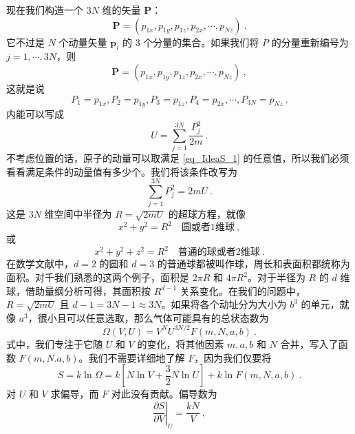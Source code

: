 现在我们构造一个 $3N $ 维的矢量 $\mathbf P$：
\begin{equation}
\mathbf{P}=\left( p_{1x},p_{1y},p_{1z},p_{2x},\cdots ,p_{Nz} \right) ~.
\end{equation}
它不过是 $N$ 个动量矢量 $\boldsymbol p_i$ 的 $3 $ 个分量的集合。如果我们将 $P $ 的分量重新编号为 $j=1, \cdots , 3N$，则
\begin{equation}
\mathbf{P}=\left( p_{1x},p_{1y},p_{1z},p_{2x},\cdots ,p_{Nz} \right) ~,
\end{equation}
这就是说
\begin{equation}
P_1=p_{1x},P_2=p_{1y},P_3=p_{1z},P_4=p_{2x},\cdots ,P_{3N}=p_{Nz}~.
\end{equation}
内能可以写成
\begin{equation} \label{eq_IdeaS_1}
U=\sum_{j=1}^{3N}{\frac{P_{j}^{2}}{2m}}~.
\end{equation}
不考虑位置的话，原子的动量可以取满足 \autoref{eq_IdeaS_1} 的任意值，所以我们必须看看满足条件的动量值有多少个。我们将该条件改写为
\begin{equation}
\sum_{j=1}^{3N}{P_{j}^{2}}=2mU~.
\end{equation}
这是 $3N$ 维空间中半径为 $R=\sqrt{2mU}$ 的超球方程，就像
\begin{equation}
x^2+y^2=R^2 \quad \text{圆或者1维球}~,
\end{equation}
或
\begin{equation}
x^2+y^2+z^2=R^2 \quad \text{普通的球或者2维球}~.
\end{equation}
在数学文献中，$ d=2 $ 的圆和 $d=3 $ 的普通球都被叫作球，周长和表面积都统称为面积。对千我们熟悉的这两个例子，面积是 $2\pi R$ 和 $4\pi R^2$。对于半径为 $R $ 的 $d $ 维球，借助量纲分析可得，其面积按 $R^{d-1}$ 关系变化。在我们的问题中，$R=\sqrt{2mU}$ 且 $d-1 = 3N-1 \approx 3N$。如果将各个动址分为大小为 $b^3$ 的单元，就像 $a^3$，很小且可以任意选取，那么气体可能具有的总状态数为
\begin{equation}
\Omega \left( V,U \right) =V^NU^{3N/2}F\left( m,N,a,b \right) ~.
\end{equation}
式中，我们专注于它随 $U $ 和 $V $ 的变化，将其他因素 $m, a, b $ 和 $N $ 合并，写入了函数 $F(m, N. a, b) $。我们不需要详细地了解 $F$，因为我们仅要将
\begin{equation}
S=k\ln \Omega =k\left[ N\ln V+\frac{3}{2}N\ln U \right] +k\ln F\left( m,N,a,b \right) ~.
\end{equation}
对 $U $ 和 $V $ 求偏导，而 $F $ 对此没有贡献。偏导数为
\begin{equation}
\left. \frac{\partial S}{\partial V} \right |_{U}^{}=\frac{kN}{V}~,
\end{equation}

